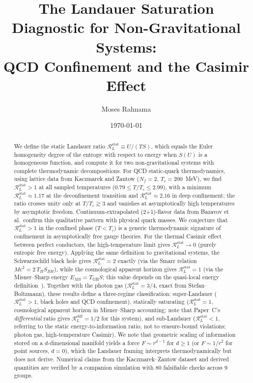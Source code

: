 \documentclass[%
 aip,
 amsmath,amssymb,
 reprint,%
]{revtex4-2}
\newcommand{\RLs}{\mathcal{R}_L^{\mathrm{stat}}}
\newcommand{\RLd}{\mathcal{R}_L^{\mathrm{diff}}}
\begin{document}
\title{The Landauer Saturation Diagnostic for Non-Gravitational Systems:\\
QCD Confinement and the Casimir Effect}

\author{Moses Rahnama}

\date{\today}

\begin{abstract}
We define the static Landauer ratio
$\RLs \equiv U/(T S)$, which equals the Euler homogeneity
degree of the entropy with respect to energy when $S(U)$ is a
homogeneous function, and compute it for
two non-gravitational systems
with complete thermodynamic decompositions.
For QCD static-quark thermodynamics, using lattice data from
Kaczmarek and Zantow ($N_f = 2$, $T_c = 200$~MeV), we find
$\RLs > 1$ at all sampled temperatures
($0.79 \leq T/T_c \leq 2.99$), with a minimum
$\RLs \approx 1.17$ at the deconfinement transition and
$\RLs \approx 2.16$ in deep confinement; the ratio crosses
unity only at $T/T_c \gtrsim 3$ and vanishes at asymptotically
high temperatures by asymptotic freedom.
Continuum-extrapolated (2+1)-flavor data from Bazavov et
al.\ confirm this qualitative pattern with physical quark masses.
We conjecture that $\RLs > 1$ in the confined phase ($T < T_c$)
is a generic thermodynamic signature of confinement in
asymptotically free gauge theories.
For the thermal Casimir effect between perfect conductors, the
high-temperature limit gives $\RLs \to 0$ (purely entropic
free energy).
Applying the same definition to gravitational systems, the
Schwarzschild black hole gives $\RLs = 2$ exactly
(via the Smarr relation $Mc^2 = 2\,T_H S_{BH}$), while the
cosmological apparent horizon gives $\RLs = 1$ (via the
Misner--Sharp energy $E_{MS} = T_{\mathrm{GH}} S$; this value depends on the
quasi-local energy definition~\cite{Trivedi2024}).
Together with the photon gas ($\RLs = 3/4$, exact from
Stefan--Boltzmann), these results define a three-regime
classification: super-Landauer ($\RLs > 1$, black holes and
QCD confinement), statically saturating ($\RLs = 1$,
cosmological apparent horizon in Misner--Sharp accounting;
note that Paper~C's \emph{differential} ratio gives
$\RLd = 1/2$ for this system), and sub-Landauer ($\RLs < 1$,
referring to the static energy-to-information ratio, not to
erasure-bound violations; photon gas, high-temperature Casimir).
We note that geometric scaling of information stored on a
$d$-dimensional manifold yields a force $F \sim r^{d-1}$ for
$d \geq 1$ (or $F \sim 1/r^2$ for point sources, $d = 0$),
which the Landauer framing interprets thermodynamically but does not
derive.
Numerical claims from the Kaczmarek--Zantow dataset and derived
quantities are verified by a companion simulation with
80 falsifiable checks across 9 groups.
\end{abstract}
\end{document}
